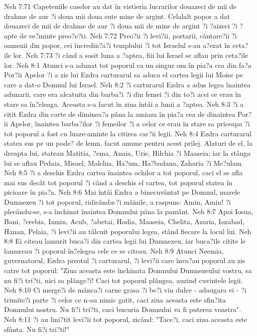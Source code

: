 Neh 7:71  Capeteniile caselor au dat în vistieria lucrarilor douazeci de mii de drahme de aur ?i doua mii doua sute mine de argint. Celalalt popor a dat douazeci de mii de drahme de aur ?i doua mii de mine de argint ?i ?aizeci ?i ?apte de ve?minte preo?e?ti.
Neh 7:72  Preo?ii ?i levi?ii, portarii, cântare?ii ?i oamenii din popor, cei încredin?a?i templului ?i tot Israelul s-au a?ezat în ceta?ile lor.
Neh 7:73  ?i când a sosit luna a ?aptea, fiii lui Israel se aflau prin ceta?ile lor.
Neh 8:1  Atunci s-a adunat tot poporul ca un singur om în pia?a cea din fa?a Por?ii Apelor ?i a zis lui Ezdra carturarul sa aduca el cartea legii lui Moise pe care a dat-o Domnul lui Israel.
Neh 8:2  ?i carturarul Ezdra a adus legea înaintea adunarii, care era alcatuita din barba?i ?i din femei ?i din to?i acei ce erau în stare sa în?eleaga. Aceasta s-a facut în ziua întâi a lunii a ?aptea.
Neh 8:3  ?i a citit Ezdra din carte de diminea?a pâna la amiaza în pia?a cea de dinaintea Por?ii Apelor, înaintea barba?ilor ?i femeilor ?i a celor ce erau în stare sa priceapa ?i tot poporul a fost cu luare-aminte la citirea car?ii legii.
Neh 8:4  Ezdra carturarul statea sus pe un pode? de lemn, facut anume pentru acest prilej. Alaturi de el, la dreapta lui, stateau Matitia, ?ema, Anaia, Urie, Hilchia ?i Maaseia; iar la stânga lui se aflau Pedaia, Misael, Malchia, Ha?um, Ha?badana, Zaharia ?i Me?ulam.
Neh 8:5  ?i a deschis Ezdra cartea înaintea ochilor a tot poporul, caci el se afla mai sus decât tot poporul ?i când a deschis el cartea, tot poporul statea în picioare în pia?a.
Neh 8:6  Mai întâi Ezdra a binecuvântat pe Domnul, marele Dumnezeu ?i tot poporul, ridicându-?i mâinile, a raspuns: Amin, Amin! ?i plecându-se, s-a închinat înaintea Domnului pâna la pamânt.
Neh 8:7  Apoi Iosua, Bani, ?erebia, Iamin, Acub, ?abetai, Hodia, Maaseia, Chelita, Azaria, Iozabad, Hanan, Pelaia, ?i levi?ii au tâlcuit poporului legea, stând fiecare la locul lui.
Neh 8:8  Ei citeau lamurit buca?i din cartea legii lui Dumnezeu, iar buca?ile citite le lamureau ?i poporul în?elegea cele ce se citeau.
Neh 8:9  Atunci Neemia, guvernatorul, Ezdra preotul ?i carturarul, ?i levi?ii care înva?au poporul au zis catre tot poporul: "Ziua aceasta este închinata Domnului Dumnezeului vostru, sa nu fi?i tri?ti, nici sa plânge?i! Caci tot poporul plângea, auzind cuvintele legii.
Neh 8:10  Ci merge?i de mânca?i carne grasa ?i be?i vin dulce - adaugara ei - ?i trimite?i parte ?i celor ce n-au nimic gatit, caci ziua aceasta este sfin?ita Domnului nostru. Nu fi?i tri?ti, caci bucuria Domnului va fi puterea voastra".
Neh 8:11  ?i au lini?tit levi?ii tot poporul, zicând: "Tace?i, caci ziua aceasta este sfânta. Nu fi?i tri?ti!"
